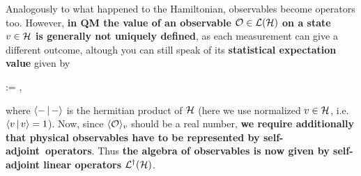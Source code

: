 \documentclass[main.tex]{subfiles}
\begin{document}
Analogously to what happened to the Hamiltonian, observables become operators too. However, \textbf{in QM the value of an observable $\mathcal{O} \in \mathcal{L}(\mathcal{H})$ on a state $v \in \mathcal{H}$ is generally not uniquely defined}, as each measurement can give a different outcome, altough you can still speak of its \textbf{statistical expectation value} given by
\begin{eqalign}
	 := ,
\end{eqalign}
where $\langle {-} \,|\, {-} \rangle$ is the hermitian product of $\mathcal{H}$ (here we use normalized $v \in \mathcal{H}$, i.e. $\langle {v} \,|\, {v} \rangle = 1$). Now, since $\langle {\mathcal{O}} \rangle_{v}$ should be a real number, \textbf{we require additionally that physical observables have to be represented by self-adjoint\footnotemark\ operators}. Thus \textbf{the algebra of observables is now given by self-adjoint linear operators $\mathcal{L}^\dagger(\mathcal{H})$}.
\end{document}
